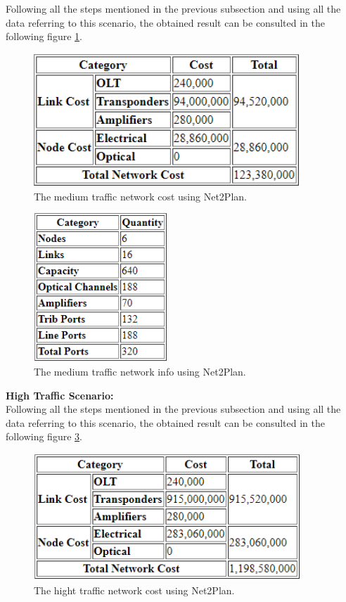 Following all the steps mentioned in the previous subsection and using all the data referring to this scenario, the obtained result can be consulted in the following figure \ref{Medium_Network_Cost_Opaque}.

\begin{figure}[h!]
\centering
\includegraphics[width=10cm]{sdf/heuristic/figures/Medium_Network_Cost_Opaque}
\caption{The medium traffic network cost using Net2Plan.}
\label{Medium_Network_Cost_Opaque}
\end{figure}

\begin{figure}[h!]
\centering
\includegraphics[width=5cm]{sdf/heuristic/figures/Medium_Network_Info_Opaque}
\caption{The medium traffic network info using Net2Plan.}
\label{Medium_Network_Info_Opaque}
\end{figure}

\newpage
\textbf{High Traffic Scenario:}\\

Following all the steps mentioned in the previous subsection and using all the data referring to this scenario, the obtained result can be consulted in the following figure \ref{High_Network_Cost_Opaque}.

\begin{figure}[h!]
\centering
\includegraphics[width=10cm]{sdf/heuristic/figures/High_Network_Cost_Opaque}
\caption{The hight traffic network cost using Net2Plan.}
\label{High_Network_Cost_Opaque}
\end{figure}

